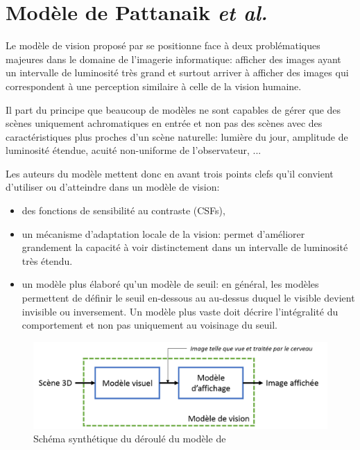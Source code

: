 	\chapter{Modèle de Pattanaik \textit{et al.}}
	\par Le modèle de vision proposé par \citep{pattanaik_multiscale_1998} se positionne face à deux problématiques majeures dans le domaine de l'imagerie informatique: afficher des images ayant un intervalle de luminosité très grand et surtout arriver à afficher des images qui correspondent à une perception similaire à celle de la vision humaine.
	
	\par Il part du principe que beaucoup de modèles ne sont capables de gérer que des scènes uniquement achromatiques en entrée et non pas des scènes avec des caractéristiques plus proches d'un scène naturelle: lumière du jour, amplitude de luminosité étendue, acuité non-uniforme de l'observateur, ...
	
	\par Les auteurs du modèle mettent donc en avant trois points clefs qu'il convient d'utiliser ou d'atteindre dans un modèle de vision:
	\begin{itemize}
	\item des fonctions de sensibilité au contraste (CSFs),
	\item un mécanisme d'adaptation locale de la vision: permet d'améliorer grandement la capacité à voir distinctement dans un intervalle de luminosité très étendu.
	\item un modèle plus élaboré qu'un modèle de seuil: en général, les modèles permettent de définir le seuil en-dessous au au-dessus duquel le visible devient invisible ou inversement. Un modèle plus vaste doit décrire l'intégralité du comportement et non pas uniquement au voisinage du seuil.
	\end{itemize}
	
	\begin{figure}
		\centering
		\includegraphics[scale=.75]{Figures/FlowChartPattanaik}
		\caption{Schéma synthétique du déroulé du modèle de \citep{pattanaik_multiscale_1998}}
		\label{fig:flowchart_pattanaik}
	\end{figure}
	
